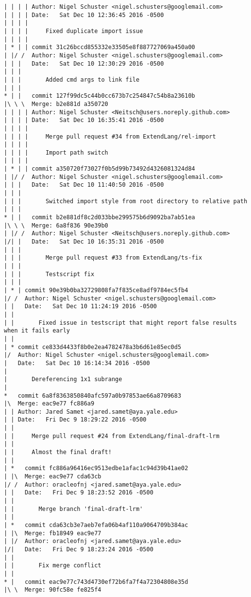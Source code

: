 \begin{lstlisting}
| | | | Author: Nigel Schuster <nigel.schusters@googlemail.com>
| | | | Date:   Sat Dec 10 12:36:45 2016 -0500
| | | | 
| | | |     Fixed duplicate import issue
| | | |     
| * | | commit 31c26bccd855332e33505e8f887727069a450a00
| |/ /  Author: Nigel Schuster <nigel.schusters@googlemail.com>
| | |   Date:   Sat Dec 10 12:30:29 2016 -0500
| | |   
| | |       Added cmd args to link file
| | |      
* | |   commit 127f99dc5c44b0cc673b7c254847c54b8a23610b
|\ \ \  Merge: b2e881d a350720
| | | | Author: Nigel Schuster <Neitsch@users.noreply.github.com>
| | | | Date:   Sat Dec 10 16:35:41 2016 -0500
| | | | 
| | | |     Merge pull request #34 from ExtendLang/rel-import
| | | |     
| | | |     Import path switch
| | | |     
| * | | commit a350720f73027f0b5d99b73492d4326081324d84
| |/ /  Author: Nigel Schuster <nigel.schusters@googlemail.com>
| | |   Date:   Sat Dec 10 11:40:50 2016 -0500
| | |   
| | |       Switched import style from root directory to relative path
| | |      
* | |   commit b2e881df8c2d033bbe299575b6d9092ba7ab51ea
|\ \ \  Merge: 6a8f836 90e39b0
| |/ /  Author: Nigel Schuster <Neitsch@users.noreply.github.com>
|/| |   Date:   Sat Dec 10 16:35:31 2016 -0500
| | |   
| | |       Merge pull request #33 from ExtendLang/ts-fix
| | |       
| | |       Testscript fix
| | |    
| * | commit 90e39b0ba32729808fa7f835ce8adf9784ec5fb4
|/ /  Author: Nigel Schuster <nigel.schusters@googlemail.com>
| |   Date:   Sat Dec 10 11:24:19 2016 -0500
| |   
| |       Fixed issue in testscript that might report false results when it fails early
| |   
| * commit ce833d4433f8b0e2ea4782478a3b6d61e85ec0d5
|/  Author: Nigel Schuster <nigel.schusters@googlemail.com>
|   Date:   Sat Dec 10 16:14:34 2016 -0500
|   
|       Dereferencing 1x1 subrange
|    
*   commit 6a8f8363850840afc597a0b97853ae66a8709683
|\  Merge: eac9e77 fc886a9
| | Author: Jared Samet <jared.samet@aya.yale.edu>
| | Date:   Fri Dec 9 18:29:22 2016 -0500
| | 
| |     Merge pull request #24 from ExtendLang/final-draft-lrm
| |     
| |     Almost the final draft!
| |     
| *   commit fc886a96416ec9513edbe1afac1c94d39b41ae02
| |\  Merge: eac9e77 cda63cb
|/ /  Author: oracleofnj <jared.samet@aya.yale.edu>
| |   Date:   Fri Dec 9 18:23:52 2016 -0500
| |   
| |       Merge branch 'final-draft-lrm'
| |     
| *   commit cda63cb3e7aeb7efa06b4af110a9064709b384ac
| |\  Merge: fb18949 eac9e77
| |/  Author: oracleofnj <jared.samet@aya.yale.edu>
|/|   Date:   Fri Dec 9 18:23:24 2016 -0500
| |   
| |       Fix merge conflict
| |     
* |   commit eac9e77c743d4730ef72b6fa7f4a72304808e35d
|\ \  Merge: 90fc58e fe825f4

\end{lstlisting}
